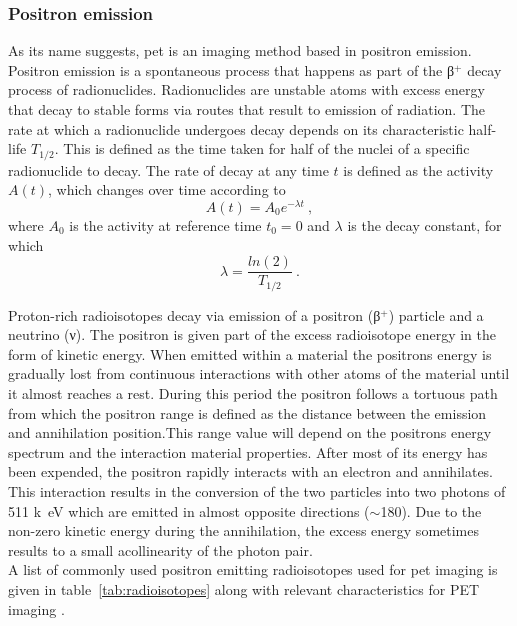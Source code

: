 \subsubsection{Positron emission}
As its name suggests, \gls{pet} is an imaging method based in positron emission. Positron emission is a spontaneous process that happens as part of the β$^{+}$ decay process of radionuclides. 
Radionuclides are unstable atoms with excess energy that decay to stable forms via routes that result to emission of radiation.
The rate at which a radionuclide undergoes decay depends on its characteristic half-life $T_{1/2}$. This is defined as the time taken for half of the nuclei of a specific radionuclide to decay. The rate of decay at any time $t$ is defined as the activity $A(t)$, which changes over time according to
\begin{equation} \label{Decay}
A(t) = A_0 e^{-\lambda t} \ ,
\end{equation}
where $A_0$ is the activity at reference time $t_0=0$ and $\lambda$ is the decay constant, for which 
\begin{equation} \label{Decayconstant}
\lambda = \frac{ln(2)}{T_{1/2}} \ .
\end{equation}

Proton-rich radioisotopes decay via emission of a positron (β$^{+}$) particle and a neutrino (ν). The positron is given part of the excess radioisotope energy in the form of kinetic energy. When emitted within a material the positrons energy is gradually lost from continuous interactions with other atoms of the material until it almost reaches a rest. During this period the positron follows a tortuous path from which the positron range is defined as the distance between the emission and annihilation position.This range value will depend on the positrons energy spectrum and the interaction material properties. After most of its energy has been expended, the positron rapidly interacts with an electron and annihilates. This interaction results in the conversion of the two particles into two photons of 511 \si{k\electronvolt} which are emitted in almost opposite directions ($\sim$180\degree). Due to the non-zero kinetic energy during the annihilation, the excess energy sometimes results to a small acollinearity of the photon pair.\\
 
A list of commonly used positron emitting radioisotopes used for \gls{pet} imaging is given in table~\ref{tab:radioisotopes} along with relevant characteristics for PET imaging \cite{Conti2016}.

